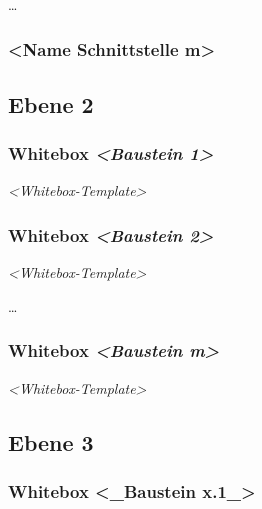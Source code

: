 \documentclass[
]{article}
\begin{document}
\ldots{}

\hypertarget{__name_schnittstelle_m}{%
\subsubsection{\textless Name Schnittstelle
m\textgreater{}}\label{__name_schnittstelle_m}}

\hypertarget{_ebene_2}{%
\subsection{Ebene 2}\label{_ebene_2}}

\hypertarget{_whitebox_emphasis_baustein_1_emphasis}{%
\subsubsection{\texorpdfstring{Whitebox \emph{\textless Baustein
1\textgreater{}}}{Whitebox \textless Baustein 1\textgreater{}}}\label{_whitebox_emphasis_baustein_1_emphasis}}

\emph{\textless Whitebox-Template\textgreater{}}

\hypertarget{_whitebox_emphasis_baustein_2_emphasis}{%
\subsubsection{\texorpdfstring{Whitebox \emph{\textless Baustein
2\textgreater{}}}{Whitebox \textless Baustein 2\textgreater{}}}\label{_whitebox_emphasis_baustein_2_emphasis}}

\emph{\textless Whitebox-Template\textgreater{}}

\ldots{}

\hypertarget{_whitebox_emphasis_baustein_m_emphasis}{%
\subsubsection{\texorpdfstring{Whitebox \emph{\textless Baustein
m\textgreater{}}}{Whitebox \textless Baustein m\textgreater{}}}\label{_whitebox_emphasis_baustein_m_emphasis}}

\emph{\textless Whitebox-Template\textgreater{}}

\hypertarget{_ebene_3}{%
\subsection{Ebene 3}\label{_ebene_3}}

\hypertarget{_whitebox_baustein_x_1}{%
\subsubsection{Whitebox \textless\_Baustein
x.1\_\textgreater{}}\label{_whitebox_baustein_x_1}}
\end{document}
